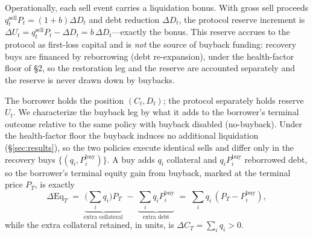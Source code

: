 \documentclass[12pt]{article}
\begin{document}
Operationally, each sell event carries a liquidation bonus. With gross sell proceeds $q_t^{\text{sell}}P_t=(1+b)\Delta D_t$ and debt reduction $\Delta D_t$, the protocol reserve increment is $\Delta U_t=q_t^{\text{sell}}P_t-\Delta D_t=b\,\Delta D_t$---exactly the bonus. This reserve accrues to the protocol as first-loss capital and is \emph{not} the source of buyback funding: recovery buys are financed by reborrowing (debt re-expansion), under the health-factor floor of \S2, so the restoration leg and the reserve are accounted separately and the reserve is never drawn down by buybacks.

The borrower holds the position $(C_t,D_t)$; the protocol separately holds reserve $U_t$. We characterize the buyback leg by what it adds to the borrower's terminal outcome relative to the same policy with buyback disabled (no-buyback). Under the health-factor floor the buyback induces no additional liquidation (\S\ref{sec:results}), so the two policies execute identical sells and differ only in the recovery buys $\{(q_i,P_i^{\text{buy}})\}$. A buy adds $q_i$ collateral and $q_iP_i^{\text{buy}}$ reborrowed debt, so the borrower's terminal equity gain from buyback, marked at the terminal price $P_T$, is exactly
\[
\Delta\mathrm{Eq}_T \;=\; \underbrace{\Big(\textstyle\sum_i q_i\Big)P_T}_{\text{extra collateral}} \;-\; \underbrace{\textstyle\sum_i q_iP_i^{\text{buy}}}_{\text{extra debt}} \;=\; \sum_i q_i\,(P_T-P_i^{\text{buy}}),
\]
while the extra collateral retained, in units, is $\Delta C_T=\sum_i q_i>0$.
\end{document}
